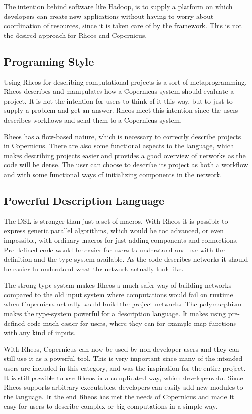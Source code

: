 The intention behind software like Hadoop, is to supply a platform on
which developers can create new applications without having to worry
about coordination of resources, since it is taken care of by the
framework. This is not the desired approach for Rheos and Copernicus.

\subsection{Programing Style}
Using Rheos for describing computational projects is a sort of
metaprogramming. Rheos describes and manipulates how a Copernicus
system should evaluate a project. It is not the intention for users
to think of it this way, but to just to supply a problem and get an
answer. Rheos meet this intention since the users describes workflows
and send them to a Copernicus system.

Rheos has a flow-based nature, which is necessary to correctly
describe projects in Copernicus. There are also some functional
aspects to the language, which makes describing projects easier and
provides a good overview of networks as the code will be dense. The
user can choose to describe its project as both a workflow and with
some functional ways of initializing components in the network.


\subsection{Powerful Description Language}
The DSL is stronger than just a set of macros. With Rheos it is
possible to express generic parallel algorithms, which would be too
advanced, or even impossible, with ordinary macros for just adding
components and connections. Pre-defined code would be easier for users
to understand and use with the definition and the type-system
available. As the code describes networks it should be easier to
understand what the network actually look like.

The strong type-system makes Rheos a much safer way of building
networks compared to the old input system where computations would
fail on runtime when Copernicus actually would build the project
networks. The polymorphism makes the type-system powerful for a
description language. It makes using pre-defined code much easier for
users, where they can for example map functions with any kind of
inputs.

With Rheos, Copernicus can now be used by non-developer users and they
can still use it as a powerful tool. This is very important since many
of the intended users are included in this category, and was the
inspiration for the entire project. It is still possible to use Rheos
in a complicated way, which developers do. Since Rheos supports
arbitrary executables, developers can easily add new modules to the
language. In the end Rheos has met the needs of Copernicus and made it
easy for users to describe complex or big computations in a simple
way.
